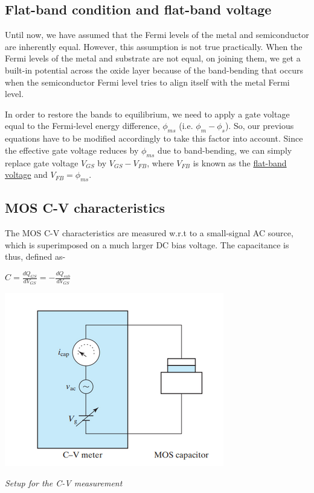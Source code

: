 \documentclass[12 pt]{article}
\begin{document}
\subsection{Flat-band condition and flat-band voltage}
Until now, we have assumed that the Fermi levels of the metal and semiconductor are inherently equal. However, this assumption is not true practically. When the Fermi levels of the metal and substrate are not equal, on joining them, we get a built-in potential across the oxide layer because of the band-bending that occurs when the semiconductor Fermi level tries to align itself with the metal Fermi level. \par

In order to restore the bands to equilibrium, we need to apply a gate voltage equal to the Fermi-level energy difference, $\phi_{ms}$ (i.e. $\phi_{m}-\phi_{s}$). So, our previous equations have to be modified accordingly to take this factor into account. Since the effective gate voltage reduces by $\phi_{ms}$ due to band-bending, we can simply replace gate voltage $V_{GS}$ by $V_{GS}-V_{FB}$, where $V_{FB}$ is known as the \href{https://en.wikipedia.org/wiki/Flat_band_potential}{flat-band voltage} and $V_{FB} = \phi_{ms}$.

\subsection{MOS C-V characteristics}

The MOS C-V characteristics are measured w.r.t to a small-signal AC source, which is superimposed on a much larger DC bias voltage. The capacitance is thus, defined as-
\begin{center}
    $ C = \frac{dQ_{GS}}{dV_{GS}} = -\frac{dQ_{sub}}{dV_{GS}}$
\end{center}

\par
\begin{center}
    \includegraphics{MOS_C-V_measurement.png}
\end{center}
\begin{center}
    \emph{\hspace{2.5 cm}Setup for the C-V measurement\newline}
\end{center}
\par
\end{document}
